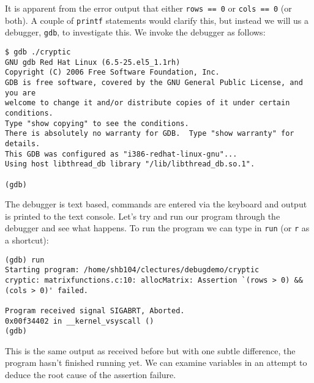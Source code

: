 \documentclass[a4paper,12pt]{article}
\begin{document}
It is apparent from the error output that either {\tt rows == 0} or {\tt cols == 0} (or both). A couple of {\tt printf} statements would clarify this, but instead we will us a debugger, {\tt gdb}, to investigate this. We invoke the debugger as follows:
\begin{verbatim}
$ gdb ./cryptic
GNU gdb Red Hat Linux (6.5-25.el5_1.1rh)
Copyright (C) 2006 Free Software Foundation, Inc.
GDB is free software, covered by the GNU General Public License, and you are
welcome to change it and/or distribute copies of it under certain conditions.
Type "show copying" to see the conditions.
There is absolutely no warranty for GDB.  Type "show warranty" for details.
This GDB was configured as "i386-redhat-linux-gnu"...
Using host libthread_db library "/lib/libthread_db.so.1".

(gdb) 
\end{verbatim}
The debugger is text based, commands are entered via the keyboard and output is printed to the text console. Let's try and run our program through the debugger and see what happens. To run the program we can type in {\tt run} (or {\tt r} as a shortcut):
\begin{verbatim}
(gdb) run 
Starting program: /home/shb104/clectures/debugdemo/cryptic 
cryptic: matrixfunctions.c:10: allocMatrix: Assertion `(rows > 0) && (cols > 0)' failed.

Program received signal SIGABRT, Aborted.
0x00f34402 in __kernel_vsyscall ()
(gdb) 
\end{verbatim}
This is the same output as received before but with one subtle difference, the program hasn't finished running yet. We can examine variables in an attempt to deduce the root cause of the assertion failure.
\end{document}
